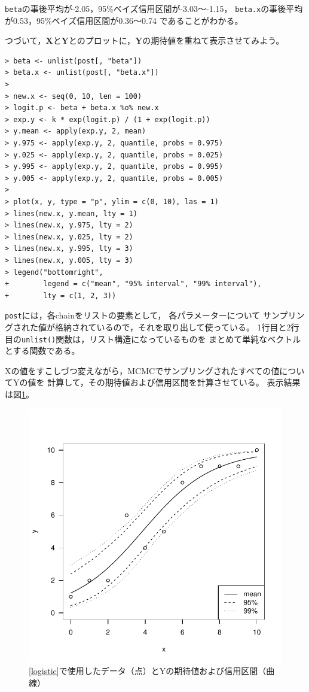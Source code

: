 \documentclass[11pt,uplatex]{jsarticle}
\begin{document}
\noindent
\texttt{beta}の事後平均が-2.05，95\%ベイズ信用区間が-3.03〜-1.15，
\texttt{beta.x}の事後平均が0.53，95\%ベイズ信用区間が0.36〜0.74
であることがわかる。


つづいて，$\bm{X}$と$\bm{Y}$とのプロットに，$\bm{Y}$の期待値を重ねて表示させてみよう。
\begin{lstlisting}
> beta <- unlist(post[, "beta"])
> beta.x <- unlist(post[, "beta.x"])
> 
> new.x <- seq(0, 10, len = 100)
> logit.p <- beta + beta.x %o% new.x
> exp.y <- k * exp(logit.p) / (1 + exp(logit.p))
> y.mean <- apply(exp.y, 2, mean)
> y.975 <- apply(exp.y, 2, quantile, probs = 0.975)
> y.025 <- apply(exp.y, 2, quantile, probs = 0.025)
> y.995 <- apply(exp.y, 2, quantile, probs = 0.995)
> y.005 <- apply(exp.y, 2, quantile, probs = 0.005)
> 
> plot(x, y, type = "p", ylim = c(0, 10), las = 1)
> lines(new.x, y.mean, lty = 1)
> lines(new.x, y.975, lty = 2)
> lines(new.x, y.025, lty = 2)
> lines(new.x, y.995, lty = 3)
> lines(new.x, y.005, lty = 3)
> legend("bottomright",
+        legend = c("mean", "95% interval", "99% interval"),
+        lty = c(1, 2, 3))
\end{lstlisting}
\noindent
\texttt{post}には，各chainをリストの要素として，
各パラメーターについて
サンプリングされた値が格納されているので，それを取り出して使っている。
1行目と2行目の\texttt{unlist()}関数は，リスト構造になっているものを
まとめて単純なベクトルとする関数である。

Xの値をすこしづつ変えながら，MCMCでサンプリングされたすべての値についてYの値を
計算して，その期待値および信用区間を計算させている。
表示結果は図\ref{example2exp_plot}。
\begin{figure}[htbp]
  \begin{center}
    \includegraphics[bb=0 0 360 360, clip, width=240 bp]{example2_exp.pdf}
  \end{center}
  \caption{\ref{logistic}で使用したデータ（点）とYの期待値および信用区間（曲線）}
  \label{example2exp_plot}
\end{figure}
\end{document}
